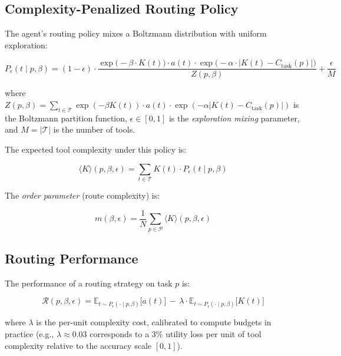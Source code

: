 \documentclass[12pt]{article}
\theoremstyle{definition}
\begin{document}
\subsection{Complexity-Penalized Routing Policy}

The agent's routing policy mixes a Boltzmann distribution with uniform exploration:

\begin{equation}
P_\epsilon(t \mid p, \beta) = (1 - \epsilon) \cdot \frac{\exp\big(-\beta \cdot K(t)\big) \cdot a(t) \cdot \exp\big(-\alpha \cdot |K(t) - C_{\mathrm{task}}(p)|\big)}{Z(p, \beta)} + \frac{\epsilon}{M}
\label{eq:routing-policy}
\end{equation}

where $Z(p, \beta) = \sum_{t \in \mathcal{T}} \exp(-\beta K(t)) \cdot a(t) \cdot \exp(-\alpha |K(t) - C_{\mathrm{task}}(p)|)$ is the Boltzmann partition function, $\epsilon \in [0,1]$ is the \emph{exploration mixing} parameter, and $M = |\mathcal{T}|$ is the number of tools.

The expected tool complexity under this policy is:

\begin{equation}
\langle K \rangle(p, \beta, \epsilon) = \sum_{t \in \mathcal{T}} K(t) \cdot P_\epsilon(t \mid p, \beta)
\label{eq:expected-complexity}
\end{equation}

The \emph{order parameter} (route complexity) is:

\begin{equation}
m(\beta, \epsilon) = \frac{1}{N} \sum_{p \in \mathcal{P}} \langle K \rangle(p, \beta, \epsilon)
\end{equation}

\subsection{Routing Performance}

The performance of a routing strategy on task $p$ is:

\begin{equation}
\mathcal{R}(p, \beta, \epsilon) = \mathbb{E}_{t \sim P_\epsilon(\cdot \mid p, \beta)}\!\big[a(t)\big] \, - \, \lambda \cdot \mathbb{E}_{t \sim P_\epsilon(\cdot \mid p, \beta)}\!\big[K(t)\big]
\label{eq:performance}
\end{equation}

where $\lambda$ is the per-unit complexity cost, calibrated to compute budgets in practice (e.g., $\lambda \approx 0.03$ corresponds to a 3\% utility loss per unit of tool complexity relative to the accuracy scale $[0,1]$).
\end{document}
